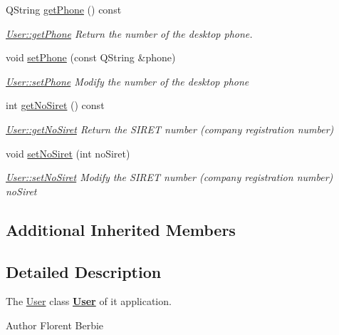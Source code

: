 \begin{DoxyCompactItemize}
Q\+String \hyperlink{classUser_a5408061a1ba87e3d56a51490464d1149}{get\+Phone} () const 
\begin{DoxyCompactList}\small\item\em \hyperlink{classUser_a5408061a1ba87e3d56a51490464d1149}{User\+::get\+Phone} Return the number of the desktop phone. \end{DoxyCompactList}\item 
void \hyperlink{classUser_a271e4179b9da5b409f98656b04431689}{set\+Phone} (const Q\+String \&phone)
\begin{DoxyCompactList}\small\item\em \hyperlink{classUser_a271e4179b9da5b409f98656b04431689}{User\+::set\+Phone} Modify the number of the desktop {\itshape phone} \end{DoxyCompactList}\item 
int \hyperlink{classUser_a721f64ecb20c42c12ca87815ffb0a274}{get\+No\+Siret} () const 
\begin{DoxyCompactList}\small\item\em \hyperlink{classUser_a721f64ecb20c42c12ca87815ffb0a274}{User\+::get\+No\+Siret} Return the S\+I\+R\+E\+T number (company registration number) \end{DoxyCompactList}\item 
void \hyperlink{classUser_a9e77d4724778cfe4f0a6fda75d3b7c52}{set\+No\+Siret} (int no\+Siret)
\begin{DoxyCompactList}\small\item\em \hyperlink{classUser_a9e77d4724778cfe4f0a6fda75d3b7c52}{User\+::set\+No\+Siret} Modify the S\+I\+R\+E\+T number (company registration number) {\itshape no\+Siret} \end{DoxyCompactList}\end{DoxyCompactItemize}
\subsection*{Additional Inherited Members}


\subsection{Detailed Description}
The \hyperlink{classUser}{User} class {\bfseries \hyperlink{classUser}{User}} of it application. 

\begin{DoxyAuthor}{Author}
Florent Berbie 
\end{DoxyAuthor}


